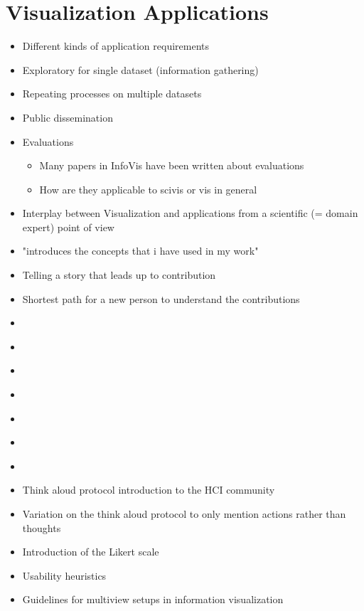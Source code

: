 \chapter{Visualization Applications}
\label{ch:visapp}

\begin{itemize}
\item Different kinds of application requirements
\item Exploratory for single dataset (information gathering)
\item Repeating processes on multiple datasets
\item Public dissemination
\item Evaluations
\begin{itemize}
    \item Many papers in InfoVis have been written about evaluations
    \item How are they applicable to scivis or vis in general
\end{itemize}
\item Interplay between Visualization and applications from a scientific (= domain expert) point of view
\item "introduces the concepts that i have used in my work"
\item Telling a story that leads up to contribution 
\item Shortest path for a new person to understand the contributions

\end{itemize}

\begin{itemize}
\item \cite{tory2005evaluating}
\item \cite{munzner2009nested}
\item \cite{tory2004human}
\item \cite{kirby2013visualization}
\item \cite{van2006bridging}
\item \cite{kosara2003thoughts}
\item \cite{carpendale2008evaluating}
\item \cite{lewis1993task} Think aloud protocol introduction to the HCI community
\item \cite{ericsson1980verbal} Variation on the think aloud protocol to only mention actions rather than thoughts
\item \cite{likert1932technique} Introduction of the Likert scale
\item \cite{nielsen1994heuristic} Usability heuristics
\item \cite{wang2000guidelines} Guidelines for multiview setups in information visualization
\end{itemize}

